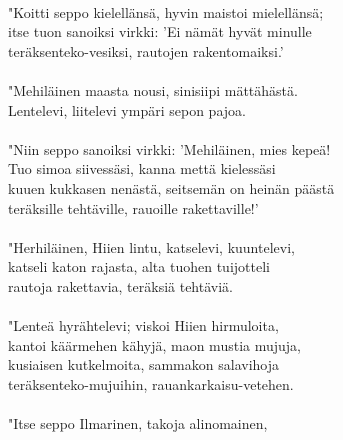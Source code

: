                                                                        \\
"Koitti seppo kielellänsä, hyvin maistoi mielellänsä;                  \\
itse tuon sanoiksi virkki: 'Ei nämät hyvät minulle                     \\
teräksenteko-vesiksi, rautojen rakentomaiksi.'                         \\
                                                                       \\
"Mehiläinen maasta nousi, sinisiipi mättähästä.                        \\
Lentelevi, liitelevi ympäri sepon pajoa.                               \\
                                                                       \\
"Niin seppo sanoiksi virkki: 'Mehiläinen, mies kepeä!                  \\
Tuo simoa siivessäsi, kanna mettä kielessäsi                           \\
kuuen kukkasen nenästä, seitsemän on heinän päästä                     \\
teräksille tehtäville, rauoille rakettaville!'                         \\
                                                                       \\
"Herhiläinen, Hiien lintu, katselevi, kuuntelevi,                      \\
katseli katon rajasta, alta tuohen tuijotteli                          \\
rautoja rakettavia, teräksiä tehtäviä.                                 \\
                                                                       \\
"Lenteä hyrähtelevi; viskoi Hiien hirmuloita,                          \\
kantoi käärmehen kähyjä, maon mustia mujuja,                           \\
kusiaisen kutkelmoita, sammakon salavihoja                             \\
teräksenteko-mujuihin, rauankarkaisu-vetehen.                          \\
                                                                       \\
"Itse seppo Ilmarinen, takoja alinomainen,                             \\
